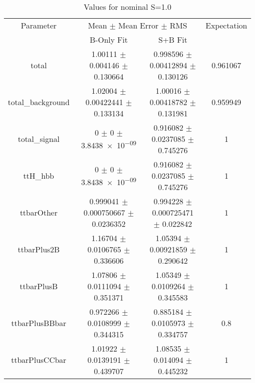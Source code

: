 \begin{table}
\centering
\caption{Values for nominal S=1.0}
\begin{tabular}{cccc}
\toprule
Parameter & \multicolumn{2}{c}{Mean $\pm$ Mean Error $\pm$ RMS} & Expectation\\
 & B-Only Fit & S+B Fit & \\
\midrule
total & \num{1.00111} $\pm$ \num{0.004146} $\pm$ \num{0.130664} & \num{0.998596} $\pm$ \num{0.00412894} $\pm$ \num{0.130126} & \num{0.961067}\\
total\_background & \num{1.02004} $\pm$ \num{0.00422441} $\pm$ \num{0.133134} & \num{1.00016} $\pm$ \num{0.00418782} $\pm$ \num{0.131981} & \num{0.959949}\\
total\_signal & \num{0} $\pm$ \num{0} $\pm$ \num{3.8438e-09} & \num{0.916082} $\pm$ \num{0.0237085} $\pm$ \num{0.745276} & \num{1}\\
ttH\_hbb & \num{0} $\pm$ \num{0} $\pm$ \num{3.8438e-09} & \num{0.916082} $\pm$ \num{0.0237085} $\pm$ \num{0.745276} & \num{1}\\
ttbarOther & \num{0.999041} $\pm$ \num{0.000750667} $\pm$ \num{0.0236352} & \num{0.994228} $\pm$ \num{0.000725471} $\pm$ \num{0.022842} & \num{1}\\
ttbarPlus2B & \num{1.16704} $\pm$ \num{0.0106765} $\pm$ \num{0.336606} & \num{1.05394} $\pm$ \num{0.00921859} $\pm$ \num{0.290642} & \num{1}\\
ttbarPlusB & \num{1.07806} $\pm$ \num{0.0111094} $\pm$ \num{0.351371} & \num{1.05349} $\pm$ \num{0.0109264} $\pm$ \num{0.345583} & \num{1}\\
ttbarPlusBBbar & \num{0.972266} $\pm$ \num{0.0108999} $\pm$ \num{0.344315} & \num{0.885184} $\pm$ \num{0.0105973} $\pm$ \num{0.334757} & \num{0.8}\\
ttbarPlusCCbar & \num{1.01922} $\pm$ \num{0.0139191} $\pm$ \num{0.439707} & \num{1.08535} $\pm$ \num{0.014094} $\pm$ \num{0.445232} & \num{1}\\
\bottomrule
\end{tabular}
\end{table}